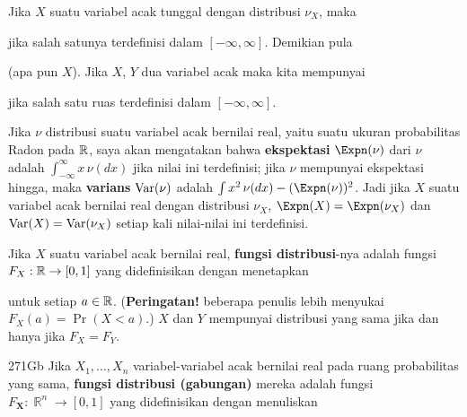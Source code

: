  Jika $X$ suatu variabel acak tunggal dengan
distribusi $\nu_{X}$, maka


\noindent jika salah satunya terdefinisi dalam $[-\infty,\infty]$.
Demikian pula


\noindent (apa pun $X$). Jika $X$, $Y$ dua variabel acak maka kita mempunyai


\noindent jika salah satu ruas terdefinisi dalam $[-\infty,\infty]$.

\medskip

 Jika $\nu$ distribusi suatu variabel acak
bernilai real, yaitu suatu ukuran probabilitas Radon pada $\Bbb R$, saya akan
mengatakan bahwa {\bf ekspektasi} $\Expn(\nu)$ dari $\nu$ adalah
$\int_{-\infty}^{\infty}x\,\nu(dx)$ jika nilai ini terdefinisi; jika $\nu$
mempunyai ekspektasi hingga, maka {\bf varians} $\mathop{\text{Var}}(\nu)$ adalah
$\int x^2\,\nu(dx)-(\Expn(\nu))^2$. Jadi jika $X$ suatu variabel acak bernilai
real dengan distribusi $\nu_X$, $\Expn(X)=\Expn(\nu_X)$ dan
$\mathop{\text{Var}}(X)=\mathop{\text{Var}}(\nu_X)$ setiap kali nilai-nilai ini terdefinisi.

 Jika $X$ suatu variabel acak bernilai
real, {\bf fungsi distribusi}-nya adalah fungsi $F_X:\Bbb R\to[0,1]$ yang
didefinisikan dengan menetapkan


\noindent untuk setiap $a\in\Bbb R$. ({\bf Peringatan!} beberapa penulis
lebih menyukai $F_X(a)=\Pr(X<a)$.)  $X$ dan $Y$ mempunyai distribusi yang sama jika dan hanya
jika $F_X=F_Y$.

\spheader 271Gb
Jika $X_1,\ldots,X_n$ variabel-variabel acak bernilai real pada ruang
probabilitas yang sama, {\bf fungsi distribusi (gabungan)} mereka adalah
fungsi $F_{\pmb{X}}:\BbbR^n\to[0,1]$ yang didefinisikan dengan menuliskan


